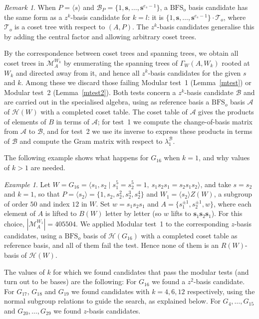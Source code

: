 \documentclass[11pt, reqno]{amsart}
\newcommand{\cB}{\mathcal{B}}
\newcommand{\cH}{\mathcal{H}}
\newcommand{\cT}{\mathcal{T}}
\newcommand{\BFS}{\mathrm{BFS}}
\numberwithin{equation}{section}
\theoremstyle{remark}
\newtheorem{remark}[theorem]{Remark}
\newtheorem{example}[theorem]{Example}
\begin{document}
\begin{remark}
When $P=\langle s\rangle$ and $\cB_P=\{1,\mathbf s,\dots,\mathbf s^{e_s-1}\}$, a $\mathrm{BFS}_o$ basis candidate has the same form as a $z^k$-basis candidate for $k=l$: it is $\{1,\mathbf s,\dots,\mathbf s^{e_s-1}\}\cdot \cT_o$, where $\cT_o$ is a coset tree with respect to $(A,P)$. The $z^k$-basis candidates generalise this by adding the central factor and allowing arbitrary coset trees.
\end{remark}

By the correspondence between coset trees and spanning trees, we obtain
all coset trees in $\mathcal M^{W_k}_A$ by enumerating the spanning
trees of $\Gamma_W(A,W_k)$ rooted at $W_k$ and directed away from it, and
hence all $z^k$-basis candidates for the given $s$ and $k$. Among these
we discard those failing Modular test~1 (Lemma~\ref{mtest}) or Modular test~2
(Lemma~\ref{mtest2}). Both tests concern a $z^k$-basis candidate $\cB$ and are
carried out in the specialised algebra, using as reference basis a
$\BFS_o$ basis $\mathcal A$ of $\cH(W)$ with a completed coset
table. The coset table of $\mathcal A$ gives the products of elements
of $B$ in terms of $\mathcal A$; for test~1 we compute the
change-of-basis matrix from $\mathcal A$ to $\cB$, and for test~2 we use
its inverse to express these products in terms of $\cB$ and compute the
Gram matrix with respect to $\lambda^{\cB}_1$.

The following example shows what happens for $G_{16}$ when $k=1$, and
why values of $k>1$ are needed.

\begin{example}\label{G16}{\rm
Let $W=G_{16}=\langle s_1,s_2\mid s_1^5=s_2^5=1,\
s_1s_2s_1=s_2s_1s_2\rangle$, and take $s=s_2$ and $k=1$, so that
$P=\langle s_2\rangle=\{1,s_2,s_2^2,s_2^3,s_2^4\}$ and $W_1=\langle s_2\rangle Z(W)$, a subgroup of
order $50$ and index $12$ in $W$. Set $w=s_1s_2s_1$ and
$A=\{s_1^{\pm1},s_2^{\pm1},w\}$, where each element of $A$ is lifted to
$B(W)$ letter by letter (so $w$ lifts to
$\mathbf s_1\mathbf s_2\mathbf s_1$). For this choice,
$|\mathcal M^{W_1}_A|=405504$. We applied Modular test~1 to the
corresponding $z$-basis candidates, using a $\mathrm{BFS}_o$ basis of
$\cH(G_{16})$ with a completed coset table as reference basis, and all of
them fail the test. Hence none of them is an $R(W)$-basis of $\cH(W)$.}
\end{example}

The values of $k$ for which we found candidates that pass the modular
tests  (and turn out to be bases) are the following: For $G_{16}$ we found a $z^2$-basis candidate.
For $G_{17}$, $G_{18}$ and $G_{19}$ we found candidates with $k=4,6,12$
respectively, using the normal subgroup relations to guide the search,
as explained below. For $G_4,\dots,G_{15}$ and $G_{20},\ldots,G_{29}$ we found $z$-basis
candidates.
\end{document}
